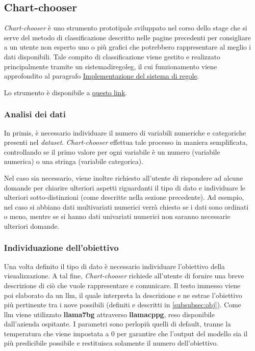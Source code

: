 \subsection{Chart-chooser}
\emph{Chart-chooser} è uno strumento prototipale sviluppato nel corso dello stage che si serve del metodo di classificazione descritto 
nelle pagine precedenti per consigliare a un utente non esperto uno o più grafici che potrebbero rappresentare al meglio i dati disponibili.
Tale compito di classificazione viene gestito e realizzato principalmente tramite un \gls{sistemadiregoleg}, il cui funzionamento viene approfondito al paragrafo
\hyperref[subsubsec:rules]{Implementazione del sistema di regole}.

Lo strumento è disponibile a \href{http://www.overleaf.com}{questo link}.

\subsubsection{Analisi dei dati}
In primis, è necessario individuare il numero di variabili numeriche e categoriche presenti nel \emph{dataset}.
\emph{Chart-chooser} effettua tale processo in maniera semplificata, controllando se il primo valore per ogni variabile
è un numero (variabile numerica) o una stringa (variabile categorica).

Nel caso sia necessario, viene inoltre richiesto all'utente di rispondere ad alcune domande per chiarire ulteriori aspetti riguardanti il tipo 
di dato e individuare le ulteriori sotto-distinzioni (come descritte nella sezione precedente). Ad esempio, nel caso si abbiano dati multivariati numerici verrà chiesto 
se i dati sono ordinati o meno, mentre se si hanno dati univariati numerici non saranno necessarie ulteriori domande.

\subsubsection{Individuazione dell'obiettivo}
Una volta definito il tipo di dato è necessario individuare l'obiettivo della visualizzazione.
A tal fine, \emph{Chart-chooser} richiede all'utente di fornire una breve descrizione di ciò che vuole rappresentare e comunicare.
Il testo immesso viene poi elaborato da un \gls{llm}, il quale interpreta la descrizione e ne estrae l'obiettivo più pertinente tra i nove possibili (definiti e descritti in \ref{subsubsec:obj}). 
Come \gls{llm} viene utilizzato \textbf{\gls{llama7bg}} attraverso \textbf{\gls{llamacppg}}, reso disponibile dall'azienda ospitante. I parametri sono perlopiù quelli di default, tranne la temperatura che viene 
impostata a 0 per garantire che l'output del modello sia il più predicibile possibile e restituisca solamente il numero dell'obiettivo.

